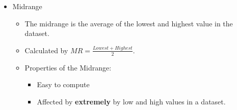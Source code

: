 \documentclass{article}
\begin{document}
\begin{itemize}
\begin{itemize}
\begin{itemize}
		\end{itemize}
	\end{itemize}
	\item Midrange
	\begin{itemize}
		\item The midrange is the average of the lowest and highest value in the dataset.
		\item Calculated by $MR=\frac{Lowest+Highest}{2}$.
		\item Properties of the Midrange:
		\begin{itemize}
			\item Easy to compute
			\item Affected by \textbf{extremely} by low and high values in a dataset.
		\end{itemize}
	\end{itemize}
\end{itemize}
\end{document}
